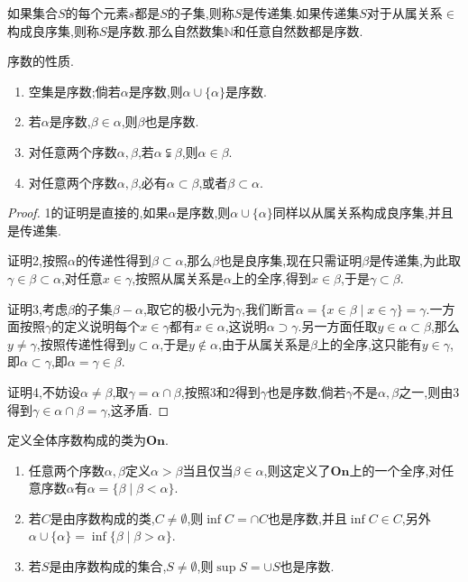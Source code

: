如果集合$S$的每个元素$s$都是$S$的子集,则称$S$是传递集.如果传递集$S$对于从属关系$\in$构成良序集,则称$S$是序数.那么自然数集$\mathbb{N}$和任意自然数都是序数.

序数的性质.
\begin{enumerate}
	\item 空集是序数;倘若$\alpha$是序数,则$\alpha\cup\{\alpha\}$是序数.
	\item 若$\alpha$是序数,$\beta\in\alpha$,则$\beta$也是序数.
	\item 对任意两个序数$\alpha,\beta$,若$\alpha\subsetneqq\beta$,则$\alpha\in\beta$.
	\item 对任意两个序数$\alpha,\beta$,必有$\alpha\subset\beta$,或者$\beta\subset\alpha$.
\end{enumerate}
\begin{proof}
	
1的证明是直接的,如果$\alpha$是序数,则$\alpha\cup\{\alpha\}$同样以从属关系构成良序集,并且是传递集.

证明2,按照$\alpha$的传递性得到$\beta\subset\alpha$,那么$\beta$也是良序集,现在只需证明$\beta$是传递集,为此取$\gamma\in\beta\subset\alpha$,对任意$x\in\gamma$,按照从属关系是$\alpha$上的全序,得到$x\in\beta$,于是$\gamma\subset\beta$.

证明3,考虑$\beta$的子集$\beta-\alpha$,取它的极小元为$\gamma$,我们断言$\alpha=\{x\in\beta\mid x\in\gamma\}=\gamma$.一方面按照$\gamma$的定义说明每个$x\in\gamma$都有$x\in\alpha$,这说明$\alpha\supset\gamma$.另一方面任取$y\in\alpha\subset\beta$,那么$y\not=\gamma$,按照传递性得到$y\subset\alpha$,于是$y\not\in\alpha$,由于从属关系是$\beta$上的全序,这只能有$y\in\gamma$,即$\alpha\subset\gamma$,即$\alpha=\gamma\in\beta$.

证明4,不妨设$\alpha\not=\beta$,取$\gamma=\alpha\cap\beta$,按照3和2得到$\gamma$也是序数,倘若$\gamma$不是$\alpha,\beta$之一,则由3得到$\gamma\in\alpha\cap\beta=\gamma$,这矛盾.
\end{proof}

定义全体序数构成的类为$\textbf{On}$.
\begin{enumerate}
	\item 任意两个序数$\alpha,\beta$定义$\alpha>\beta$当且仅当$\beta\in\alpha$,则这定义了$\textbf{On}$上的一个全序,对任意序数$\alpha$有$\alpha=\{\beta\mid\beta<\alpha\}$.
	\item 若$C$是由序数构成的类,$C\not=\emptyset$,则$\inf C=\cap C$也是序数,并且$\inf C\in C$,另外$\alpha\cup\{\alpha\}=\inf\{\beta\mid\beta>\alpha\}$.
	\item 若$S$是由序数构成的集合,$S\not=\emptyset$,则$\sup S=\cup S$也是序数.
\end{enumerate}

